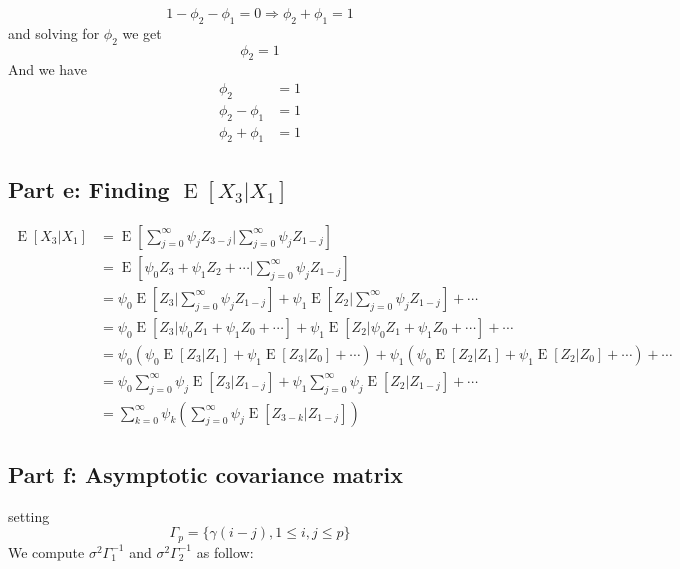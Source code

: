 \documentclass[11pt, oneside]{article}   	%
\newcommand{\E}{\operatorname{E}}
\begin{document}
\begin{equation}
1-\phi_{2}-\phi_{1}  = 0 \Longrightarrow \phi_{2}+\phi_{1} = 1
\end{equation}
and solving for $\phi_{2}$ we get
\begin{equation}
\phi_{2} = 1
\end{equation}
And we have 
\begin{equation}
\begin{aligned}
\phi_{2}& = 1\\
\phi_{2}-\phi_{1} &= 1\\
\phi_{2}+\phi_{1} &= 1
\end{aligned}
\end{equation}

\subsection{Part e: Finding $\E[X_{3}|X_{1}]$}
\begin{equation}
\begin{aligned}
\E[X_{3}|X_{1}] &=\E\left[\sum_{j=0}^{\infty}\psi_{j}Z_{3-j}\bigg|\sum_{j=0}^{\infty}\psi_{j}Z_{1-j}\right] \\
&=\E\left[ \psi_{0}Z_{3}+\psi_{1}Z_{2}+\cdots \bigg| \sum_{j=0}^{\infty}\psi_{j}Z_{1-j}    \right]\\
&=\psi_{0}\E\left[ Z_{3}\bigg|\sum_{j=0}^{\infty}\psi_{j}Z_{1-j}    \right] + \psi_{1}\E\left[ Z_{2}\bigg|\sum_{j=0}^{\infty}\psi_{j}Z_{1-j}    \right] +\cdots\\
&=\psi_{0}\E\left[  Z_{3}|\psi_{0}Z_{1}+\psi_{1}Z_{0}+\cdots  \right]+\psi_{1}\E\left[  Z_{2}|\psi_{0}Z_{1}+\psi_{1}Z_{0}+\cdots  \right]+\cdots\\
&=\psi_{0}\left(   \psi_{0}\E[Z_{3}|Z_{1}]+\psi_{1}\E[Z_{3}|Z_{0}]+\cdots  \right) +  \psi_{1}\left(   \psi_{0}\E[Z_{2}|Z_{1}]+\psi_{1}\E[Z_{2}|Z_{0}]+\cdots  \right) + \cdots\\
&=\psi_{0}\sum_{j=0}^{\infty}\psi_{j}\E[Z_{3}|Z_{1-j}] + \psi_{1}\sum_{j=0}^{\infty}\psi_{j}\E[Z_{2}|Z_{1-j}] +\cdots\\
&=\sum_{k=0}^{\infty}\psi_{k}\left(\sum_{j=0}^{\infty}\psi_{j}\E[Z_{3-k}|Z_{1-j}]\right)
\end{aligned}
\end{equation}

\subsection{Part f: Asymptotic covariance matrix}
setting
\begin{equation}
\Gamma_{p} = \{ \gamma(i-j), 1\leq i,j \leq p  \}
\end{equation}
We compute $\sigma^{2}\Gamma_{1}^{-1}$ and $\sigma^{2}\Gamma_{2}^{-1}$ as follow:
\end{document}
